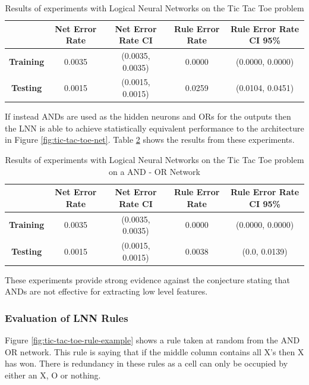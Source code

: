 \begin{table}[H]
	\begin{center}
		\begin{tabular}{| c | c | c | c | c |}
			\hline
			\textbf{} & \textbf{Net Error Rate} & \textbf{Net Error Rate CI} & \textbf{Rule Error Rate} & \textbf{Rule Error Rate CI 95\%}\\
			\hline
			\hline
			\textbf{Training} & 0.0035 & (0.0035, 0.0035) & 0.0000 & (0.0000, 0.0000)\\
			\textbf{Testing} & 0.0015 & (0.0015, 0.0015) & 0.0259 & (0.0104, 0.0451)\\
			\hline
		\end{tabular}
	\end{center}
	\caption{Results of experiments with Logical Neural Networks on the Tic Tac Toe problem}
	\label{tab:tic-tac-toe-lnn-peformance-results}
\end{table}

If instead ANDs are used as the hidden neurons and ORs for the outputs then the LNN is able to achieve statistically equivalent performance to the architecture in Figure \ref{fig:tic-tac-toe-net}. Table \ref{tab:tic-tac-toe-lnn-peformance-results-and-or} shows the results from these experiments.

\begin{table}[H]
	\begin{center}
		\begin{tabular}{| c | c | c | c | c |}
			\hline
			\textbf{} & \textbf{Net Error Rate} & \textbf{Net Error Rate CI} & \textbf{Rule Error Rate} & \textbf{Rule Error Rate CI 95\%}\\
			\hline
			\hline
			\textbf{Training} & 0.0035 & (0.0035, 0.0035) & 0.0000 & (0.0000, 0.0000)\\
			\textbf{Testing} & 0.0015 & (0.0015, 0.0015) & 0.0038 & (0.0, 0.0139)\\
			\hline
		\end{tabular}
	\end{center}
	\caption{Results of experiments with Logical Neural Networks on the Tic Tac Toe problem on a AND - OR Network}
	\label{tab:tic-tac-toe-lnn-peformance-results-and-or}
\end{table}

These experiments provide strong evidence against the conjecture stating that ANDs are not effective for extracting low level features.

\subsubsection{Evaluation of LNN Rules}
Figure \ref{fig:tic-tac-toe-rule-example} shows a rule taken at random from the AND OR network. This rule is saying that if the middle column contains all X's then X has won. There is redundancy in these rules as a cell can only be occupied by either an X, O or nothing.

